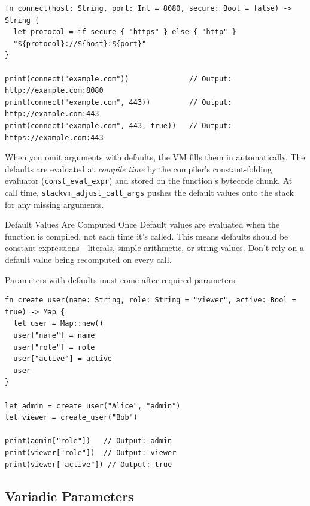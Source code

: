 \begin{lstlisting}[language=Lattice, caption={Default parameter values}]
fn connect(host: String, port: Int = 8080, secure: Bool = false) -> String {
  let protocol = if secure { "https" } else { "http" }
  "${protocol}://${host}:${port}"
}

print(connect("example.com"))              // Output: http://example.com:8080
print(connect("example.com", 443))         // Output: http://example.com:443
print(connect("example.com", 443, true))   // Output: https://example.com:443
\end{lstlisting}

When you omit arguments with defaults, the VM fills them in automatically. The defaults are evaluated at \emph{compile time} by the compiler's constant-folding evaluator (\texttt{const\_eval\_expr}) and stored on the function's bytecode chunk. At call time, \texttt{stackvm\_adjust\_call\_args} pushes the default values onto the stack for any missing arguments.

\begin{warnbox}{Default Values Are Computed Once}
Default values are evaluated when the function is compiled, not each time it's called. This means defaults should be constant expressions---literals, simple arithmetic, or string values. Don't rely on a default value being recomputed on every call.
\end{warnbox}

Parameters with defaults must come after required parameters:

\begin{lstlisting}[language=Lattice, caption={Required parameters before defaults}]
fn create_user(name: String, role: String = "viewer", active: Bool = true) -> Map {
  let user = Map::new()
  user["name"] = name
  user["role"] = role
  user["active"] = active
  user
}

let admin = create_user("Alice", "admin")
let viewer = create_user("Bob")

print(admin["role"])   // Output: admin
print(viewer["role"])  // Output: viewer
print(viewer["active"]) // Output: true
\end{lstlisting}

\subsection{Variadic Parameters}\label{sec:variadic-params}

